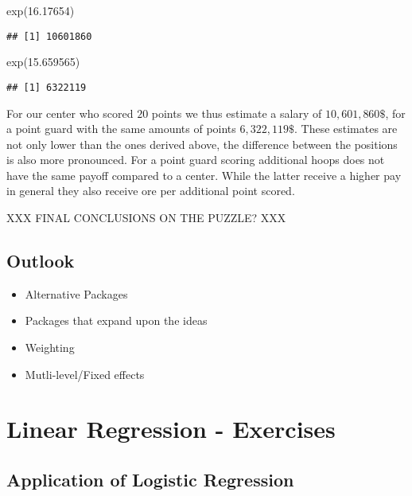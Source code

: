 \documentclass[
]{book}
\newenvironment{Shaded}{\begin{snugshade}}{\end{snugshade}}
\newcommand{\FloatTok}[1]{\textcolor[rgb]{0.00,0.00,0.81}{#1}}
\newcommand{\FunctionTok}[1]{\textcolor[rgb]{0.00,0.00,0.00}{#1}}
\newcommand{\FunctionTok}[1]{\textcolor[rgb]{0.13,0.29,0.53}{\textbf{#1}}}
\newcommand{\NormalTok}[1]{#1}
\providecommand{\tightlist}{%
  \setlength{\itemsep}{0pt}\setlength{\parskip}{0pt}}
\begin{document}
\begin{Shaded}
\begin{Highlighting}[]
\FunctionTok{exp}\NormalTok{(}\FloatTok{16.17654}\NormalTok{)}
\end{Highlighting}
\end{Shaded}

\begin{verbatim}
## [1] 10601860
\end{verbatim}

\begin{Shaded}
\begin{Highlighting}[]
\FunctionTok{exp}\NormalTok{(}\FloatTok{15.659565}\NormalTok{)}
\end{Highlighting}
\end{Shaded}

\begin{verbatim}
## [1] 6322119
\end{verbatim}

For our center who scored \(20\) points we thus estimate a salary of
\(10,601,860\$\), for a point guard with the same amounts of points \(6,322,119\$\).
These estimates are not only lower than the ones derived above, the difference
between the positions is also more pronounced. For a point guard scoring
additional hoops does not have the same payoff compared to a center. While the
latter receive a higher pay in general they also receive ore per additional
point scored.

XXX FINAL CONCLUSIONS ON THE PUZZLE? XXX

\hypertarget{outlook}{%
\section{Outlook}\label{outlook}}

\begin{itemize}
\tightlist
\item
  Alternative Packages
\item
  Packages that expand upon the ideas
\item
  Weighting
\item
  Mutli-level/Fixed effects
\end{itemize}

\hypertarget{lin-e}{%
\chapter{Linear Regression - Exercises}\label{lin-e}}

\hypertarget{application-of-logistic-regression}{%
\section{Application of Logistic Regression}\label{application-of-logistic-regression}}
\end{document}
